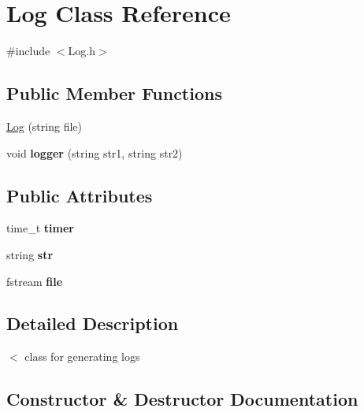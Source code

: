 \hypertarget{class_log}{}\section{Log Class Reference}
\label{class_log}


{\ttfamily \#include $<$Log.\+h$>$}

\subsection*{Public Member Functions}
\begin{DoxyCompactItemize}
\item 
\hyperlink{class_log_a5c8cbf74003eee027420431f79446b36}{Log} (string file)
\item 
void {\bfseries logger} (string str1, string str2)\hypertarget{class_log_a68112d416adaf04c6463a8a316fa5ca4}{}\label{class_log_a68112d416adaf04c6463a8a316fa5ca4}

\end{DoxyCompactItemize}
\subsection*{Public Attributes}
\begin{DoxyCompactItemize}
\item 
time\+\_\+t {\bfseries timer}\hypertarget{class_log_ab957ec356516d1f498e67e0b847ed449}{}\label{class_log_ab957ec356516d1f498e67e0b847ed449}

\item 
string {\bfseries str}\hypertarget{class_log_acb3efda3627da570c6b88cb70b731dd1}{}\label{class_log_acb3efda3627da570c6b88cb70b731dd1}

\item 
fstream {\bfseries file}\hypertarget{class_log_a98e89527fc33b2307cae506f9ac165d2}{}\label{class_log_a98e89527fc33b2307cae506f9ac165d2}

\end{DoxyCompactItemize}


\subsection{Detailed Description}
$<$ class for generating logs 

\subsection{Constructor \& Destructor Documentation}
